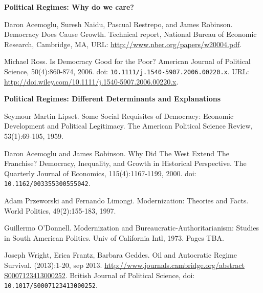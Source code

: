 \documentclass[letterpaper]{article}
\renewenvironment{itemize}{
  \begin{list}{}{
    \setlength{\leftmargin}{1.5em}
  }
}{
  \end{list}
}
\begin{document}
\begin{enumerate}
\item {\bf Political Regimes: Why do we care?}
	\begin{itemize}
		\item[$\bullet$] Daron Acemoglu, Suresh Naidu, Pascual Restrepo, and James Robinson. Democracy Does Cause Growth. Technical report, National Bureau of Economic Research, Cambridge, MA, URL: \url{http://www.nber.org/papers/w20004.pdf}.
		\item[$\bullet$] Michael Ross. Is Democracy Good for the Poor? American Journal of Political Science, 50(4):860-874,  2006. doi: \texttt{10.1111/j.1540-5907.2006.00220.x}. URL: \url{http://doi.wiley.com/10.1111/j.1540-5907.2006.00220.x}.
	\end{itemize}


\item {\bf Political Regimes: Different Determinants and Explanations}
	\begin{itemize}
		\item[$\bullet$] Seymour Martin Lipset. Some Social Requisites of Democracy: Economic Development and Political Legitimacy. The American Political Science Review, 53(1):69-105, 1959.
		\item[$\bullet$] Daron Acemoglu and James Robinson. Why Did The West Extend The Franchise? Democracy, Inequality, and Growth in Historical Perspective. The Quarterly Journal of Economics, 115(4):1167-1199, 2000. doi: \texttt{10.1162/003355300555042}.
		\item[$\bullet$] Adam Przeworski and Fernando Limongi. Modernization: Theories and Facts. World Politics, 49(2):155-183, 1997.
		\item[$\bullet$] Guillermo O'Donnell. Modernization and Bureaucratic-Authoritarianism: Studies in South American Politics. Univ of California Intl, 1973. Pages TBA.
		\item[$\bullet$] Joseph Wright, Erica Frantz, Barbara Geddes. Oil and Autocratic Regime Survival. (2013):1-20, sep 2013. \url{http://www.journals.cambridge.org/abstract S0007123413000252}. British Journal of Political Science, doi: \texttt{10.1017/S0007123413000252}.
	\end{itemize}




\end{enumerate}
\end{document}
